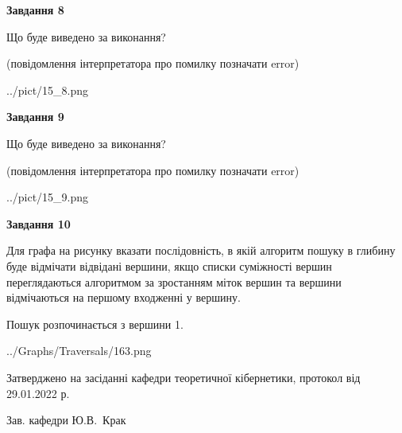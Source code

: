 \documentclass[12pt, ukrainian]{article}
\begin{document}
{\begin {large}
{\begin {center}\textbf{Завдання 8}\end {center}}\par
Що буде виведено за виконання?\par
 (повідомлення інтерпретатора про помилку позначати error)
\begin{center}
	{../pict/15_8.png}
\end{center}
\newpage

{\begin {center}\textbf{Завдання 9}\end {center}}\par
Що буде виведено за виконання?\par
 (повідомлення інтерпретатора про помилку позначати error)\par
\begin{center}
	{../pict/15_9.png}
\end{center}
\newpage

{\begin {center}\textbf{Завдання 10}\end {center}}\par
Для графа на рисунку вказати послідовність, в якій алгоритм пошуку в глибину буде відмічати відвідані вершини, якщо списки суміжності вершин переглядаються алгоритмом за зростанням міток вершин та вершини відмічаються на першому вход\-женні у вершину.\par
Пошук розпочинається з вершини 1.\par

\begin{center}
	{../Graphs/Traversals/163.png}
\end{center}\par
\newpage


\end {large}
}
{\smallskip \begin {small} Затверджено на засіданні кафедри теоретичної кібернетики, протокол  від   29.01.2022 р.\par\smallskip\smallskip
{\parbox {6.5 cm}{Зав. кафедри \dotfill Ю.В.~Крак}} \end{small}}
\end{document}
